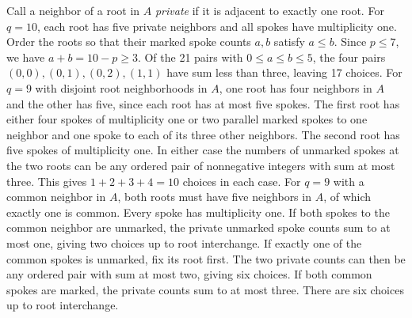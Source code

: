 \documentclass[preprint,11pt,numbers]{elsarticle-arxiv}
\numberwithin{equation}{section}
\theoremstyle{definition}
\begin{document}
Call a neighbor of a root in $A$ \emph{private} if it is
adjacent to exactly one root. For $q=10$, each root has five
private neighbors and all spokes have multiplicity one. Order
the roots so that their marked spoke counts $a,b$ satisfy $a\leq b$.
Since $p\leq7$, we have $a+b=10-p\geq3$. Of the
21 pairs with $0\leq a\leq b\leq5$, the four pairs
$(0,0),(0,1),(0,2),(1,1)$ have sum less than three, leaving
17 choices.
For $q=9$ with disjoint root neighborhoods in $A$, one root
has four neighbors in $A$ and the other has five, since each
root has at most five spokes. The first root has either four
spokes of multiplicity one or two parallel marked spokes to
one neighbor and one spoke to each of its three other neighbors.
The second root has five spokes of multiplicity one. In either case
the numbers of unmarked spokes at the two roots can be any
ordered pair of nonnegative integers with sum at most three.
This gives $1+2+3+4=10$ choices in each case.
For $q=9$ with a common neighbor in $A$, both roots must have
five neighbors in $A$, of which exactly one is common. Every
spoke has multiplicity one. If both spokes
to the common neighbor are unmarked, the private unmarked
spoke counts sum to at most one, giving two choices up to
root interchange. If exactly one of the common spokes is
unmarked, fix its root first. The two private counts can then
be any ordered pair with sum at most two, giving six choices.
If both common spokes are marked, the private counts sum to
at most three. There are six choices up to root interchange.
\end{document}
